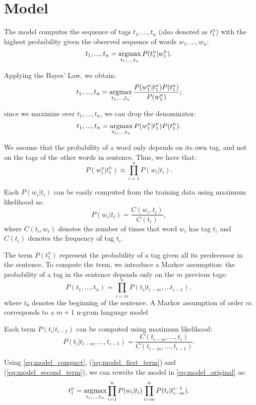 \section{Model}
\label{sec:model}

The model computes the sequence of tags $t_1, ..., t_n$ (also denoted as $t_1^n$) with the highest probability given the observed sequence of words 
$w_1, ..., w_n$:
\begin{equation}
    t_1, ..., t_n = \operatorname*{arg\!\max}_{t_1, ..., t_n} P(t_1^n | w_1^n).
    \label{eq:model_original}
\end{equation}

Applying the Bayes' Law, we obtain:
\begin{equation*}
    t_1, ..., t_n = \operatorname*{arg\!\max}_{t_1, ..., t_n} \frac{P(w_1^n | t_1^n) P(t_1^n)}{P(w_1^n)};
\end{equation*}

since we maximize over $t_1, ..., t_n$, we can drop the denominator:
\begin{equation}
    t_1, ..., t_n = \operatorname*{arg\!\max}_{t_1, ..., t_n} P(w_1^n | t_1^n) P(t_1^n).
    \label{eq:model_compact}
\end{equation}

We assume that the probability of a word only depends on its own tag, and not on the tags of the other words in sentence.
Thus, we have that:
\begin{equation}
    P(w_1^n | t_1^n) \approx \prod_{i=1}^n P(w_i | t_i).
    \label{eq:model_first_term}
\end{equation}

Each $P(w_i | t_i)$ can be easily computed from the training data using maximum likelihood as:
\begin{equation*}
    P(w_i | t_i) = \frac{C(w_i, t_i)}{C(t_i)},
\end{equation*}
where $C(t_i, w_i)$ denotes the number of times that word $w_i$ has tag $t_i$ 
and $C(t_i)$ denotes the frequency of tag $t_i$.

The term $P(t_1^n)$ represent the probability of a tag given all its predecessor in the sentence.
To compute the term, we introduce a Markov assumption: the probability of a tag in the sentence
depends only on the $m$ previous tags:
\begin{equation}
    P(t_1, ..., t_n) = \prod_{i=m}^n P(t_i | t_{i-m}, ... t_{i-1}),
    \label{eq:model_second_term}
\end{equation}
where $t_0$ denotes the beginning of the sentence.
A Markov assumption of order $m$ corresponds to a $m+1$ n-gram language model

Each term $P(t_i | t_{i-1})$ can be computed using maximum likelihood:
\begin{equation*}
    P(t_i | t_{i-m}, ..., t_{i-1}) = \frac{C(t_{i-m}, ..., t_{i})}{C(t_{i-m}, ..., t_{i-1})}.
\end{equation*}

Using \cref{eq:model_compact}, (\ref{eq:model_first_term}) and (\ref{eq:model_second_term}), we can rewrite the model in \cref{eq:model_original} as:
\begin{equation*}
    t_1^n = \operatorname*{arg\!\max}_{t_1, ..., t_n} \prod_{i=1}^n P(w_i | t_i) \prod_{i=m}^n P(t_i | t_{i-m}^{i-1}).
\end{equation*}

